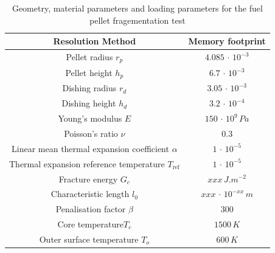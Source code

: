 \begin{table}[H]
    \centering
    \begin{tabular}{||c c||} 
        \hline
        Resolution Method & Memory footprint
        \\
        [0.5ex] 
        \hline\hline
        Pellet radius \(r_{p}\)                                      & \(4.085\,\cdot\,10^{-3}\)   
        \\ \hline
        Pellet height \(h_{p}\)                                      & \(6.7\,\cdot\,10^{-3}\)     
        \\ \hline
        Dishing radius \(r_{d}\)                                     & \(3.05\,\cdot\,10^{-3}\)    
        \\ \hline
        Dishing height \(h_{d}\)                                     & \(3.2\,\cdot\,10^{-4}\)     
        \\ \hline
        Young's modulus \(E\)                                        & \(150\,\cdot\,10^{9}\, Pa\) 
        \\ \hline
        Poisson's ratio \(\nu\)                                      & \(0.3\)                     
        \\ \hline
        Linear mean thermal expansion coefficient \(\alpha\)         & \(1\,\cdot\,10^{-5}\)       
        \\ \hline
        Thermal expansion reference temperature \(T_{\mathrm{ref}}\) & \(1\,\cdot\,10^{-5}\)       
        \\ \hline
        Fracture energy \(G_{c}\)                                    & \(xxx\,J.m^{-2}\)           
        \\ \hline
        Characteristic length  \(l_{0}\)                             & \(xxx\,\cdot\,10^{-xx}\,m\) 
        \\ \hline
        Penalisation factor \(\beta\)                                & \(300\)                     
        \\ \hline
        Core temperature\(T_{c}\)                                    & \(1500\,K\)                 
        \\ \hline
        Outer surface temperature \(T_{o}\)                          & \(600\,K\)            
        \\ \hline
    \end{tabular}
    \caption{Geometry, material parameters and loading parameters for the fuel pellet fragementation test}
    \label{tbl:micromorphicdamage:fuel_pellet_fragmentation_test_parameters}
\end{table}

